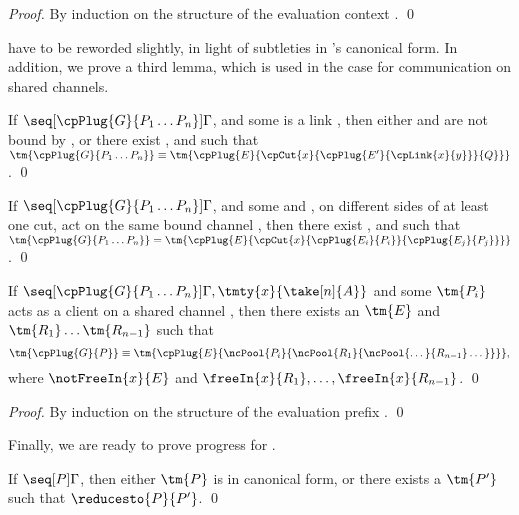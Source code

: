 \documentclass[UKenglish]{llncs}
\begin{document}
\begin{proof}
  By induction on the structure of the evaluation context .
  \qed
\end{proof}
 have to be reworded slightly,
in light of subtleties in \nodcap's canonical form.
In addition, we prove a third lemma, which is used in the case for communication
on shared channels.
\begin{lemma}\label{thm:nc-progress-link}
  If $\seq[{ \cpPlug{G}{P_1 \dots P_n} }]{ \Gamma }$, and some  is a
  link , then either  and  are not bound by
  , or there exist ,  and  such that
  $\tm{\cpPlug{G}{P_1 \dots P_n}} \equiv
  \tm{\cpPlug{E}{\cpCut{x}{\cpPlug{E'}{\cpLink{x}{y}}}{Q}}}$.
  \qed
\end{lemma}
\begin{lemma}\label{thm:nc-progress-beta}
  If $\seq[{ \cpPlug{G}{P_1 \dots P_n} }]{ \Gamma }$, and some  and
  , on different sides of at least one cut, act on the same bound
  channel , then there exist ,  and  such that 
  \(
  \tm{\cpPlug{G}{P_1 \dots P_n}} =
  \tm{\cpPlug{E}{\cpCut{x}{\cpPlug{E_i}{P_i}}{\cpPlug{E_j}{P_j}}}}
  \).
  \qed
\end{lemma}
\begin{lemma}\label{thm:nc-progress-shared}
  If $\seq[{ \cpPlug{G}{P_1 \dots P_n} }]{ \Gamma, \tmty{x}{\take[n]{A}} }$ and
  some $\tm{P_i}$ acts as a client on a shared channel , then there exists
  an $\tm{E}$ and $\tm{R_1}\dots\tm{R_{n-1}}$ such that
  \[
    \tm{\cpPlug{G}{P}} \equiv
    \tm{\cpPlug{E}{\ncPool{P_i}{\ncPool{R_1}{\ncPool{\dots}{R_{n-1}}\dots}}}},
  \]
  where $\notFreeIn{x}{E}$ and $\freeIn{x}{R_1},\dots,\freeIn{x}{R_{n-1}}$.
  \qed
\end{lemma}
\begin{proof}
  By induction on the structure of the evaluation prefix .
  \qed
\end{proof}
Finally, we are ready to prove progress for \nodcap.
\begin{theorem}[Progress]\label{thm:nc-progress}
  If $\seq[{ P }]{ \Gamma }$, then either $\tm{P}$ is in canonical form, or
  there exists a $\tm{P'}$ such that $\reducesto{P}{P'}$. 
  \qed
\end{theorem}
\end{document}

